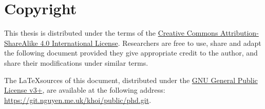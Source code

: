 \chapter*{Copyright}

This thesis is distributed under the terms of the
\href{http://creativecommons.org/licenses/by-sa/4.0/}{Creative Commons Attribution-ShareAlike 4.0 International License}.
Researchers are free to use, share and adapt the following document
provided they give appropriate credit to the author, and share their modifications under similar terms.

The \LaTeX sources of this document,
distributed under the \href{https://www.gnu.org/licenses/gpl.html}{GNU General Public License v3+},
are available at the following address: \url{https://git.nguyen.me.uk/khoi/public/phd.git}.
